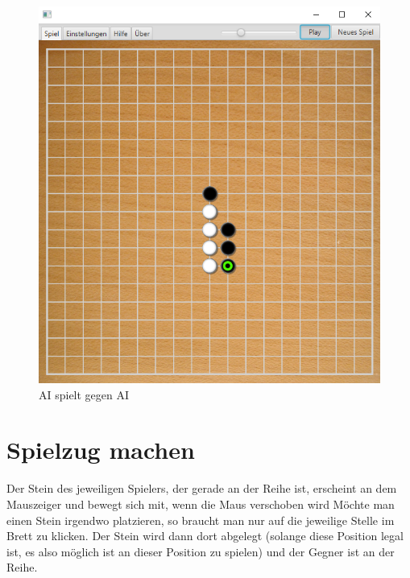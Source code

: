 \documentclass[11pt]{article}
\newcommand{\1}{{\mathds{1}}}
\newcommand{\imagewidth}{.4\textheight}%
\begin{document}
	\begin{figure}[h]
		\centering
		\includegraphics[width=\imagewidth]{ai.png}
		\caption{AI spielt gegen AI}
		\label{ai}
	\end{figure}

	\FloatBarrier	
	\section{Spielzug machen}
	
	Der Stein des jeweiligen Spielers, der gerade an der Reihe ist, erscheint an dem Mauszeiger und bewegt sich mit, wenn die Maus verschoben wird
	Möchte man einen Stein irgendwo platzieren, so braucht man nur auf die jeweilige Stelle im Brett zu klicken.
	Der Stein wird dann dort abgelegt (solange diese Position legal ist, es also möglich ist an dieser Position zu spielen) und der Gegner ist an der Reihe. 
\end{document}
